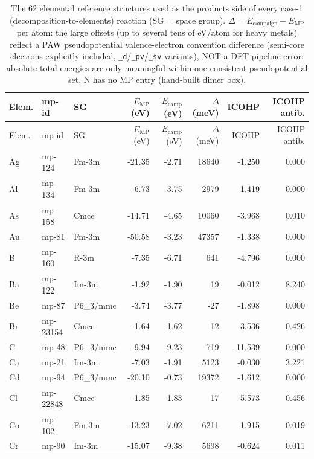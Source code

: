 \begin{longtable}{@{}ll l@{\hspace{4pt}} rrrrr@{}}
\caption{The 62 elemental reference structures used as the products side of every case-1 (decomposition-to-elements) reaction (SG = space group). $\Delta = E_\text{campaign} - E_\text{MP}$ per atom: the large offsets (up to several tens of eV/atom for heavy metals) reflect a PAW pseudopotential valence-electron convention difference (semi-core electrons explicitly included, \texttt{\_d}/\texttt{\_pv}/\texttt{\_sv} variants), NOT a DFT-pipeline error: absolute total energies are only meaningful within one consistent pseudopotential set. N has no MP entry (hand-built dimer box).}\label{tab:si-elements}\\
\toprule
Elem. & mp-id & SG & $E_\text{MP}$ (eV) & $E_\text{camp}$ (eV) & $\Delta$ (meV) & ICOHP & ICOHP antib. \\
\midrule
\endfirsthead
\toprule
Elem. & mp-id & SG & $E_\text{MP}$ (eV) & $E_\text{camp}$ (eV) & $\Delta$ (meV) & ICOHP & ICOHP antib. \\
\midrule
\endhead
\bottomrule
\endfoot
\bottomrule
\endlastfoot
Ag & mp-124 & Fm-3m & -21.35 & -2.71 & 18640 & -1.250 & 0.000 \\
Al & mp-134 & Fm-3m & -6.73 & -3.75 & 2979 & -1.419 & 0.000 \\
As & mp-158 & Cmce & -14.71 & -4.65 & 10060 & -3.968 & 0.010 \\
Au & mp-81 & Fm-3m & -50.58 & -3.23 & 47357 & -1.338 & 0.000 \\
B & mp-160 & R-3m & -7.35 & -6.71 & 641 & -4.796 & 0.000 \\
Ba & mp-122 & Im-3m & -1.92 & -1.90 & 19 & -0.012 & 8.240 \\
Be & mp-87 & P6_3/mmc & -3.74 & -3.77 & -27 & -1.898 & 0.000 \\
Br & mp-23154 & Cmce & -1.64 & -1.62 & 12 & -3.536 & 0.426 \\
C & mp-48 & P6_3/mmc & -9.94 & -9.23 & 719 & -11.539 & 0.000 \\
Ca & mp-21 & Im-3m & -7.03 & -1.91 & 5123 & -0.030 & 3.221 \\
Cd & mp-94 & P6_3/mmc & -20.10 & -0.73 & 19372 & -1.612 & 0.000 \\
Cl & mp-22848 & Cmce & -1.85 & -1.83 & 17 & -5.573 & 0.456 \\
Co & mp-102 & Fm-3m & -13.23 & -7.02 & 6211 & -1.915 & 0.019 \\
Cr & mp-90 & Im-3m & -15.07 & -9.38 & 5698 & -0.624 & 0.011 \\

\end{longtable}
